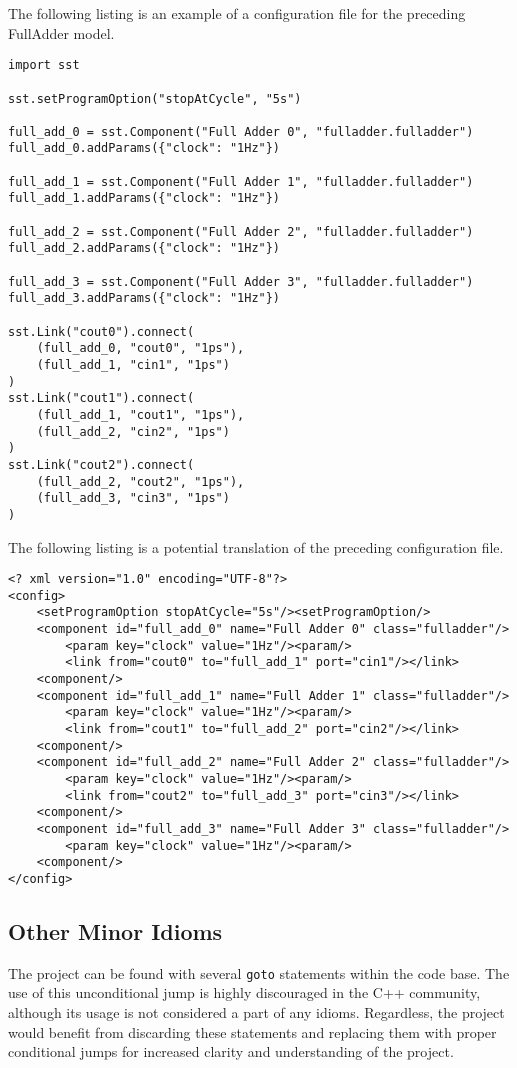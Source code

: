 The following listing is an example of a configuration file for the preceding FullAdder model.
\begin{lstlisting}[style=customPython,label=runPy,caption=Example SST Configuration File \\ File: run.py]
import sst

sst.setProgramOption("stopAtCycle", "5s")

full_add_0 = sst.Component("Full Adder 0", "fulladder.fulladder")
full_add_0.addParams({"clock": "1Hz"})

full_add_1 = sst.Component("Full Adder 1", "fulladder.fulladder")
full_add_1.addParams({"clock": "1Hz"})

full_add_2 = sst.Component("Full Adder 2", "fulladder.fulladder")
full_add_2.addParams({"clock": "1Hz"})

full_add_3 = sst.Component("Full Adder 3", "fulladder.fulladder")
full_add_3.addParams({"clock": "1Hz"})

sst.Link("cout0").connect(
    (full_add_0, "cout0", "1ps"),
    (full_add_1, "cin1", "1ps")
)
sst.Link("cout1").connect(
    (full_add_1, "cout1", "1ps"),
    (full_add_2, "cin2", "1ps")
)
sst.Link("cout2").connect(
    (full_add_2, "cout2", "1ps"),
    (full_add_3, "cin3", "1ps")
)
\end{lstlisting}

The following listing is a potential translation of the preceding configuration file.
\begin{lstlisting}[style=customXML,label=xml,caption=Potential Implementation of an SST Configuration File \\ File: run.xml]
<? xml version="1.0" encoding="UTF-8"?>
<config>
    <setProgramOption stopAtCycle="5s"/><setProgramOption/>
    <component id="full_add_0" name="Full Adder 0" class="fulladder"/>
        <param key="clock" value="1Hz"/><param/>
        <link from="cout0" to="full_add_1" port="cin1"/></link>
    <component/>
    <component id="full_add_1" name="Full Adder 1" class="fulladder"/>
        <param key="clock" value="1Hz"/><param/>
        <link from="cout1" to="full_add_2" port="cin2"/></link>
    <component/>
    <component id="full_add_2" name="Full Adder 2" class="fulladder"/>
        <param key="clock" value="1Hz"/><param/>
        <link from="cout2" to="full_add_3" port="cin3"/></link>
    <component/>
    <component id="full_add_3" name="Full Adder 3" class="fulladder"/>
        <param key="clock" value="1Hz"/><param/>
    <component/>
</config>
\end{lstlisting}

\subsection{Other Minor Idioms}
The project can be found with several \texttt{goto} statements within the code base. The use of this unconditional jump is highly discouraged in the C++ community, although its usage is not considered a part of any idioms. Regardless, the project would benefit from discarding these statements and replacing them with proper conditional jumps for increased clarity and understanding of the project.
